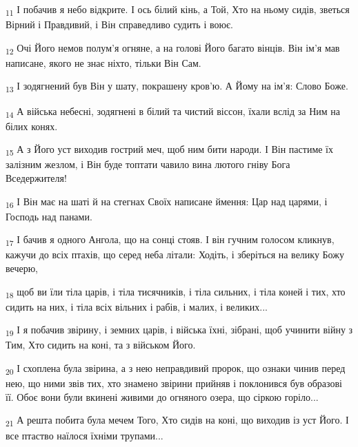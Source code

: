 \begin{tcolorbox}
\textsubscript{11} І побачив я небо відкрите. І ось білий кінь, а Той, Хто на ньому сидів, зветься Вірний і Правдивий, і Він справедливо судить і воює.
\end{tcolorbox}
\begin{tcolorbox}
\textsubscript{12} Очі Його немов полум'я огняне, а на голові Його багато вінців. Він ім'я мав написане, якого не знає ніхто, тільки Він Сам.
\end{tcolorbox}
\begin{tcolorbox}
\textsubscript{13} І зодягнений був Він у шату, покрашену кров'ю. А Йому на ім'я: Слово Боже.
\end{tcolorbox}
\begin{tcolorbox}
\textsubscript{14} А війська небесні, зодягнені в білий та чистий віссон, їхали вслід за Ним на білих конях.
\end{tcolorbox}
\begin{tcolorbox}
\textsubscript{15} А з Його уст виходив гострий меч, щоб ним бити народи. І Він пастиме їх залізним жезлом, і Він буде топтати чавило вина лютого гніву Бога Вседержителя!
\end{tcolorbox}
\begin{tcolorbox}
\textsubscript{16} І Він має на шаті й на стегнах Своїх написане ймення: Цар над царями, і Господь над панами.
\end{tcolorbox}
\begin{tcolorbox}
\textsubscript{17} І бачив я одного Ангола, що на сонці стояв. І він гучним голосом кликнув, кажучи до всіх птахів, що серед неба літали: Ходіть, і зберіться на велику Божу вечерю,
\end{tcolorbox}
\begin{tcolorbox}
\textsubscript{18} щоб ви їли тіла царів, і тіла тисячників, і тіла сильних, і тіла коней і тих, хто сидить на них, і тіла всіх вільних і рабів, і малих, і великих...
\end{tcolorbox}
\begin{tcolorbox}
\textsubscript{19} І я побачив звірину, і земних царів, і війська їхні, зібрані, щоб учинити війну з Тим, Хто сидить на коні, та з військом Його.
\end{tcolorbox}
\begin{tcolorbox}
\textsubscript{20} І схоплена була звірина, а з нею неправдивий пророк, що ознаки чинив перед нею, що ними звів тих, хто знамено звірини прийняв і поклонився був образові її. Обоє вони були вкинені живими до огняного озера, що сіркою горіло...
\end{tcolorbox}
\begin{tcolorbox}
\textsubscript{21} А решта побита була мечем Того, Хто сидів на коні, що виходив із уст Його. І все птаство наїлося їхніми трупами...
\end{tcolorbox}
